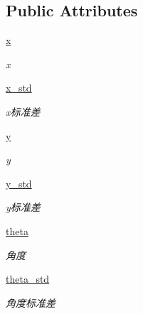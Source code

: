 \subsection*{Public Attributes}
\begin{DoxyCompactItemize}
\item 
\hyperlink{classselect___a__dox_1_1_a_m_c_l__unit_ab99918fce5a7575038f3b740fa24068b}{x}
\begin{DoxyCompactList}\small\item\em x \end{DoxyCompactList}\item 
\hyperlink{classselect___a__dox_1_1_a_m_c_l__unit_ad1329d297c070512332f7eedc1c45593}{x\+\_\+std}
\begin{DoxyCompactList}\small\item\em x标准差 \end{DoxyCompactList}\item 
\hyperlink{classselect___a__dox_1_1_a_m_c_l__unit_a2a8c0b97aabfa5060f7cd48707c778a9}{y}
\begin{DoxyCompactList}\small\item\em y \end{DoxyCompactList}\item 
\hyperlink{classselect___a__dox_1_1_a_m_c_l__unit_a3fe7e19950224b3ad9fba262dbf76847}{y\+\_\+std}
\begin{DoxyCompactList}\small\item\em y标准差 \end{DoxyCompactList}\item 
\hyperlink{classselect___a__dox_1_1_a_m_c_l__unit_a23061bf69414dd3fae1b97ca16e7b772}{theta}
\begin{DoxyCompactList}\small\item\em 角度 \end{DoxyCompactList}\item 
\hyperlink{classselect___a__dox_1_1_a_m_c_l__unit_a64c8ffbe1a0efdcc2bb10c579d166bb3}{theta\+\_\+std}
\begin{DoxyCompactList}\small\item\em 角度标准差 \end{DoxyCompactList}\end{DoxyCompactItemize}
